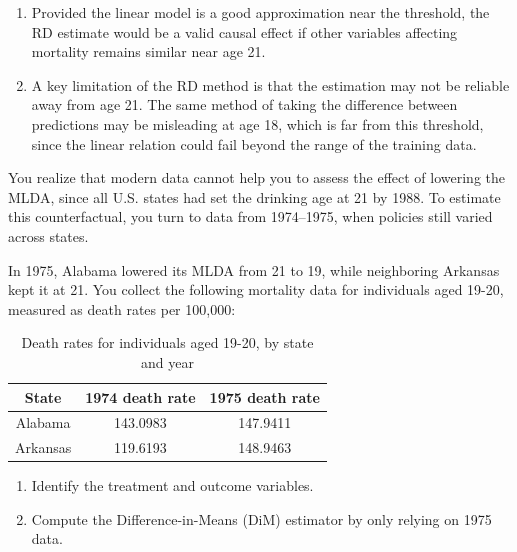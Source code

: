 \documentclass[11pt]{exam}
\begin{document}
\begin{questions}
\begin{solution}
\begin{enumerate}[label=(\alph*)]
    \item Provided the linear model is a good approximation near the threshold, the RD estimate would be a valid causal effect if other variables affecting mortality remains similar near age 21.

    \item A key limitation of the RD method is that the estimation may not be reliable away from age 21. 
    The same method of taking the difference between predictions may be misleading at age 18, which is far from this threshold, since  the linear relation could fail beyond the range of the training data.
\end{enumerate}

\end{solution}

\question[3.5] 
You realize that modern data cannot help you to assess the effect of lowering the MLDA, since all U.S. states had set the drinking age at 21 by 1988. To estimate this counterfactual, you turn to data from 1974–1975, when policies still varied across states.

In 1975, Alabama lowered its MLDA from 21 to 19, while neighboring Arkansas kept it at 21. You collect the following mortality data for individuals aged 19-20, measured as death rates per 100,000:
\vspace{-0.2cm}

\begin{table}[ht]
    \centering
    \caption{Death rates for individuals aged 19-20, by state and year}
    \label{tab:deaths_1975}
    \begin{tabular}{ccc}
        \toprule
        \textbf{State} & \textbf{1974 death rate} & \textbf{1975 death rate} \\
        \midrule
        Alabama & 143.0983 & 147.9411 \\
        Arkansas & 119.6193 & 148.9463 \\
        \bottomrule
    \end{tabular}
\end{table}

\begin{enumerate}[label=(\alph*)]
    \item Identify the treatment and outcome variables.

    \item Compute the Difference-in-Means (DiM) estimator by only relying on 1975 data.

    

\end{enumerate}
\end{questions}
\end{document}
